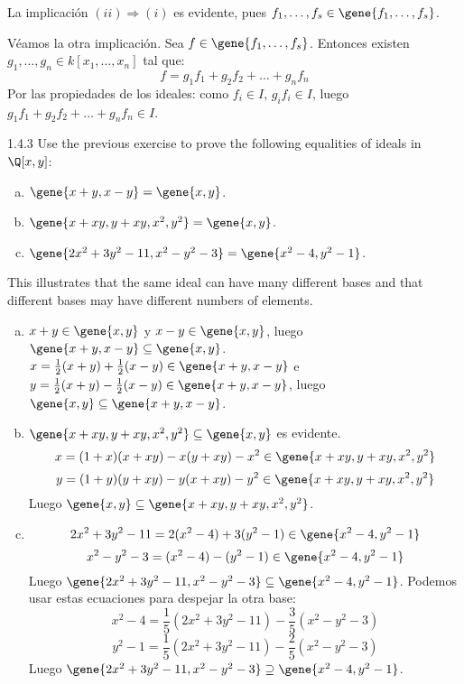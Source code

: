 \documentclass[twoside]{article}
\begin{document}
\begin{solucion}
La implicación $(ii)\Rightarrow(i)$ es evidente, pues $f_1,\dots,f_s \in \gene{f_1,\dots, f_s}$.

Véamos la otra implicación.
Sea $f \in \gene{f_1,\dots,f_s}$.
Entonces existen $g_1,\dots,g_n \in k[x_1,\dots,x_n]$ tal que:
\[ f = g_1 f_1 + g_2 f_2 + \dots + g_n f_n \]
Por las propiedades de los ideales: como $f_i \in I$, $g_i f_i \in I$, luego $g_1 f_1 + g_2 f_2 + \dots + g_n f_n \in I$.
\end{solucion}

\newpage

\begin{ejercicio}{1.4.3}
Use the previous exercise to prove the following equalities of ideals in $\Q[x,y]$:
\begin{enumerate}[a.]
\item $\gene{x+y,x-y} = \gene{x,y}$.
\item $\gene{x+xy, y+xy, x^2, y^2} = \gene{x, y}$.
\item $\gene{2x^2+3y^2-11, x^2-y^2-3} = \gene{x^2-4, y^2-1}$.
\end{enumerate}
This illustrates that the same ideal can have many different bases and that different bases may have different numbers of elements.
\end{ejercicio}
\begin{solucion}\mbox{}
\begin{enumerate}[a.]
\item $x+y \in \gene{x,y}$ y $x-y \in \gene{x,y}$, luego $\gene{x+y,x-y} \subseteq \gene{x,y}$.
$x = \frac{1}{2} (x+y) + \frac{1}{2}  (x-y) \in \gene{x+y,x-y}$ e $y = \frac{1}{2} (x+y) - \frac{1}{2} (x-y) \in \gene{x+y, x-y}$, luego $\gene{x,y} \subseteq \gene{x+y,x-y}$.
\item $\gene{x+xy, y+xy, x^2, y^2} \subseteq \gene{x, y}$ es evidente.
\[ x = (1+x)(x + xy) - x(y+xy) - x^2 \in \gene{x+xy, y+xy, x^2, y^2} \]
\[ y = (1+y)(y + xy) - y(x+xy) - y^2 \in \gene{x+xy, y+xy, x^2, y^2} \]
Luego $\gene{x,y} \subseteq \gene{x+xy, y+xy, x^2, y^2}$.
\item 
\[ 2x^2+3y^2 - 11 = 2(x^2-4)+3(y^2-1) \in \gene{x^2-4, y^2-1} \]
\[ x^2-y^2-3 = (x^2-4) - (y^2-1) \in \gene{x^2-4, y^2-1} \]
Luego $\gene{2x^2+3y^2-11, x^2-y^2-3} \subseteq \gene{x^2-4, y^2-1}$.
Podemos usar estas ecuaciones para despejar la otra base:
\[ x^2-4 = \frac{1}{5} (2x^2+3y^2-11) - \frac{3}{5} (x^2-y^2-3) \]
\[ y^2-1 = \frac{1}{5}(2x^2+3y^2-11) - \frac{2}{5}(x^2-y^2-3) \]
Luego $\gene{2x^2+3y^2-11, x^2-y^2-3} \supseteq \gene{x^2-4, y^2-1}$.
\end{enumerate}
\end{solucion}
\end{document}
